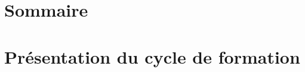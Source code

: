 \newpage

\pagestyle{empty} %
\chapter*{Sommaire}

\newpage

\chapter{Présentation du cycle de formation}
\startcontents[chap1]







\stopcontents[chap1]


\chapter{\formationA}

%
% 
% 
%
%
%
%
%
% 
%
% 
% 
% 


\chapter{\formationB}


\chapter{\formationC}

\chapter{\formationD}

